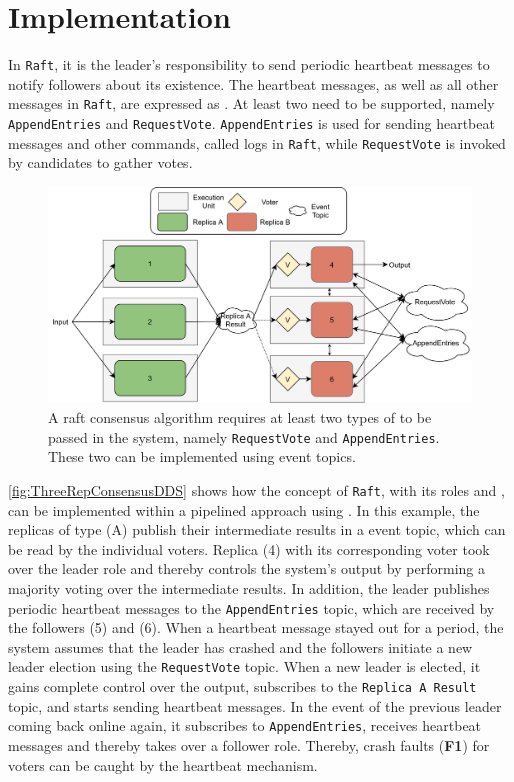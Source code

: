 \chapter{Implementation}

In \texttt{Raft}, it is the leader's responsibility to send periodic heartbeat messages to notify followers about its existence.
The heartbeat messages, as well as all other messages in \texttt{Raft}, are expressed as .
At least two  need to be supported, namely \texttt{AppendEntries} and \texttt{RequestVote}.
\texttt{AppendEntries} is used for sending heartbeat messages and other commands, called logs in \texttt{Raft}, while \texttt{RequestVote} is invoked by candidates to gather votes.

\begin{figure}[!hb]
	\centering
	\includegraphics[width=0.9\linewidth]{images/ThreeComponentConsensusDDS}
	\caption{A raft consensus algorithm requires at least two types of  to be passed in the system, namely \texttt{RequestVote} and \texttt{AppendEntries}. These two can be implemented using  event topics.}
	\label{fig:ThreeRepConsensusDDS}
\end{figure}

\autoref{fig:ThreeRepConsensusDDS} shows how the concept of \texttt{Raft}, with its roles and , can be implemented within a pipelined approach using .
In this example, the replicas of type (A) publish their intermediate results in a  event topic, which can be read by the individual voters.
Replica (4) with its corresponding voter took over the leader role and thereby controls the system's output by performing a majority voting over the intermediate results.
In addition, the leader publishes periodic heartbeat messages to the \texttt{AppendEntries} topic, which are received by the followers (5) and (6).
When a heartbeat message stayed out for a period, the system assumes that the leader has crashed and the followers initiate a new leader election using the \texttt{RequestVote} topic.
When a new leader is elected, it gains complete control over the output, subscribes to the \texttt{Replica A Result} topic, and starts sending heartbeat messages.
In the event of the previous leader coming back online again, it subscribes to \texttt{AppendEntries}, receives heartbeat messages and thereby takes over a follower role.
Thereby, crash faults (\textbf{F1}) for voters can be caught by the heartbeat mechanism.
\\

